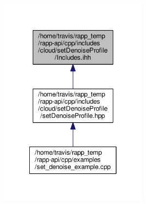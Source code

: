 \begin{figure}[H]
\begin{center}
\leavevmode
\includegraphics[width=212pt]{cloud_2setDenoiseProfile_2Includes_8ihh__dep__incl}
\end{center}
\end{figure}
